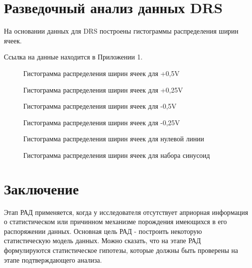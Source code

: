 \documentclass[a4paper, 12pt]{article}
\begin{document}
\section{Разведочный анализ данных DRS}

На основании данных для DRS построены гистограммы распределения ширин ячеек.

Ссылка на данные находится в Приложении 1.

\begin{figure}[H]
\center{\texttt{[image: +0\_5V]}}
\caption{Гистограмма распределения ширин ячеек для +0,5V}
\end{figure}

\begin{figure}[H]
\center{\texttt{[image: +0\_25V]}}
\caption{Гистограмма распределения ширин ячеек для +0,25V}
\end{figure}

\begin{figure}[H]
\center{\texttt{[image: -0\_5V]}}
\caption{Гистограмма распределения ширин ячеек для -0,5V}
\end{figure}

\begin{figure}[H]
\center{\texttt{[image: -0\_25V]}}
\caption{Гистограмма распределения ширин ячеек для -0,25V}
\end{figure}

\begin{figure}[H]
\caption{Гистограмма распределения ширин ячеек для нулевой линии}
\end{figure}

\begin{figure}[H]
\caption{Гистограмма распределения ширин ячеек для набора синусоид}
\end{figure}

\newpage
\section*{Заключение}

Этап РАД применяется, когда у исследователя отсутствует априорная информация о статистическом или причинном механизме порождения имеющихся в его распоряжении данных. Основная цель РАД - построить некоторую статистическую модель данных. Можно сказать, что на этапе РАД формулируются статистическое гипотезы, которые должны быть проверены на этапе подтверждающего анализа.
\end{document}
